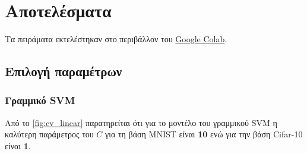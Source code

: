 \documentclass[a4paper]{article}
\begin{document}
\section{Αποτελέσματα}

Τα πειράματα εκτελέστηκαν στο περιβάλλον του
\href{https://colab.research.google.com/}{Google Colab}.

\subsection{Επιλογή παραμέτρων}

\subsubsection{Γραμμικό SVM}

Από το \autoref{fig:cv_linear} παρατηρείται ότι για το μοντέλο του γραμμικού SVM
η καλύτερη παράμετρος του $C$ για τη βάση MNIST είναι {\bf10} ενώ για την βάση
Cifar-10 είναι {\bf1}.
\end{document}
